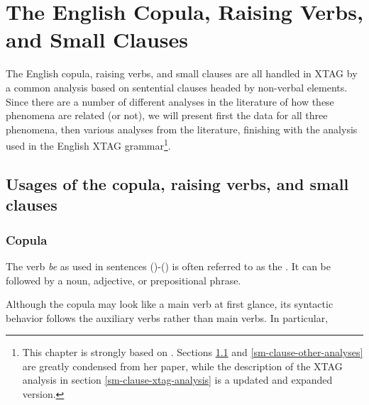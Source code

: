 \chapter{The English Copula, Raising Verbs, and Small Clauses}
\label{small-clauses}

The English copula, raising verbs, and small clauses are all handled in XTAG by
a common analysis based on sentential clauses headed by non-verbal elements.
Since there are a number of different analyses in the literature of how these
phenomena are related (or not), we will present first the data for all three
phenomena, then various analyses from the literature, finishing with the
analysis used in the English XTAG grammar\footnote{This chapter is strongly
based on \cite{heycock91}.  Sections \ref{sm-clause-data} and
\ref{sm-clause-other-analyses} are greatly condensed from her paper, while the 
description of the XTAG analysis in section \ref{sm-clause-xtag-analysis} is a
updated and expanded version.}.


\section{Usages of the copula, raising verbs, and small clauses}
\label{sm-clause-data}

\subsection{Copula}
\label{copula-data}

The verb {\it be} as used in sentences ({})-({}) is often
referred to as the .  It can be followed by a noun, adjective, or
prepositional phrase.


Although the copula may look like a main verb at first glance, its syntactic
behavior follows the auxiliary verbs rather than main verbs.  In particular,

